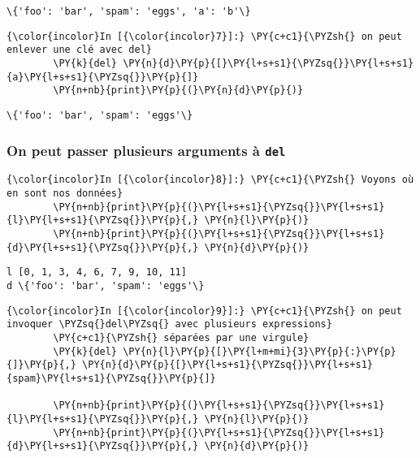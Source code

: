     \begin{Verbatim}[commandchars=\\\{\}]
\{'foo': 'bar', 'spam': 'eggs', 'a': 'b'\}

    \end{Verbatim}

    \begin{Verbatim}[commandchars=\\\{\}]
{\color{incolor}In [{\color{incolor}7}]:} \PY{c+c1}{\PYZsh{} on peut enlever une clé avec del}
        \PY{k}{del} \PY{n}{d}\PY{p}{[}\PY{l+s+s1}{\PYZsq{}}\PY{l+s+s1}{a}\PY{l+s+s1}{\PYZsq{}}\PY{p}{]}
        \PY{n+nb}{print}\PY{p}{(}\PY{n}{d}\PY{p}{)}
\end{Verbatim}


    \begin{Verbatim}[commandchars=\\\{\}]
\{'foo': 'bar', 'spam': 'eggs'\}

    \end{Verbatim}

    \hypertarget{on-peut-passer-plusieurs-arguments-uxe0-del}{%
\subsubsection{\texorpdfstring{On peut passer plusieurs arguments à
\texttt{del}}{On peut passer plusieurs arguments à del}}\label{on-peut-passer-plusieurs-arguments-uxe0-del}}

    \begin{Verbatim}[commandchars=\\\{\}]
{\color{incolor}In [{\color{incolor}8}]:} \PY{c+c1}{\PYZsh{} Voyons où en sont nos données}
        \PY{n+nb}{print}\PY{p}{(}\PY{l+s+s1}{\PYZsq{}}\PY{l+s+s1}{l}\PY{l+s+s1}{\PYZsq{}}\PY{p}{,} \PY{n}{l}\PY{p}{)}
        \PY{n+nb}{print}\PY{p}{(}\PY{l+s+s1}{\PYZsq{}}\PY{l+s+s1}{d}\PY{l+s+s1}{\PYZsq{}}\PY{p}{,} \PY{n}{d}\PY{p}{)}
\end{Verbatim}


    \begin{Verbatim}[commandchars=\\\{\}]
l [0, 1, 3, 4, 6, 7, 9, 10, 11]
d \{'foo': 'bar', 'spam': 'eggs'\}

    \end{Verbatim}

    \begin{Verbatim}[commandchars=\\\{\}]
{\color{incolor}In [{\color{incolor}9}]:} \PY{c+c1}{\PYZsh{} on peut invoquer \PYZsq{}del\PYZsq{} avec plusieurs expressions}
        \PY{c+c1}{\PYZsh{} séparées par une virgule}
        \PY{k}{del} \PY{n}{l}\PY{p}{[}\PY{l+m+mi}{3}\PY{p}{:}\PY{p}{]}\PY{p}{,} \PY{n}{d}\PY{p}{[}\PY{l+s+s1}{\PYZsq{}}\PY{l+s+s1}{spam}\PY{l+s+s1}{\PYZsq{}}\PY{p}{]}
        
        \PY{n+nb}{print}\PY{p}{(}\PY{l+s+s1}{\PYZsq{}}\PY{l+s+s1}{l}\PY{l+s+s1}{\PYZsq{}}\PY{p}{,} \PY{n}{l}\PY{p}{)}
        \PY{n+nb}{print}\PY{p}{(}\PY{l+s+s1}{\PYZsq{}}\PY{l+s+s1}{d}\PY{l+s+s1}{\PYZsq{}}\PY{p}{,} \PY{n}{d}\PY{p}{)}
\end{Verbatim}


